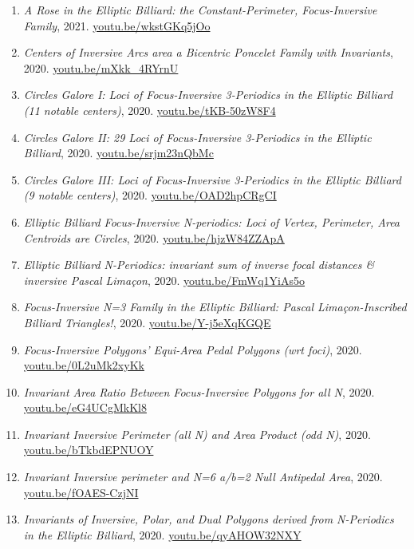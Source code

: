 \documentclass[12pt]{article}
\begin{document}
\begin{enumerate}[resume]
\item \textit{A Rose in the Elliptic Billiard: the Constant-Perimeter, Focus-Inversive Family}, 2021. \href{https://youtu.be/wkstGKq5jOo}{\url{youtu.be/wkstGKq5jOo}}
\item \textit{Centers of Inversive Arcs area a Bicentric Poncelet Family with Invariants}, 2020. \href{https://youtu.be/mXkk_4RYrnU}{\url{youtu.be/mXkk\_4RYrnU}}
\item \textit{Circles Galore I: Loci of Focus-Inversive 3-Periodics in the Elliptic Billiard (11 notable centers)}, 2020. \href{https://youtu.be/tKB-50zW8F4}{\url{youtu.be/tKB-50zW8F4}}
\item \textit{Circles Galore II: 29 Loci of Focus-Inversive 3-Periodics in the Elliptic Billiard}, 2020. \href{https://youtu.be/srjm23nQbMc}{\url{youtu.be/srjm23nQbMc}}
\item \textit{Circles Galore III: Loci of Focus-Inversive 3-Periodics in the Elliptic Billiard (9 notable centers)}, 2020. \href{https://youtu.be/OAD2hpCRgCI}{\url{youtu.be/OAD2hpCRgCI}}
\item \textit{Elliptic Billiard Focus-Inversive N-periodics: Loci of Vertex, Perimeter, Area Centroids are Circles}, 2020. \href{https://youtu.be/hjzW84ZZApA}{\url{youtu.be/hjzW84ZZApA}}
\item \textit{Elliptic Billiard N-Periodics: invariant sum of inverse focal distances \& inversive Pascal Limaçon}, 2020. \href{https://youtu.be/FmWq1YiAs5o}{\url{youtu.be/FmWq1YiAs5o}}
\item \textit{Focus-Inversive N=3 Family in the Elliptic Billiard: Pascal Limaçon-Inscribed Billiard Triangles!}, 2020. \href{https://youtu.be/Y-j5eXqKGQE}{\url{youtu.be/Y-j5eXqKGQE}}
\item \textit{Focus-Inversive Polygons' Equi-Area Pedal Polygons (wrt foci)}, 2020. \href{https://youtu.be/0L2uMk2xyKk}{\url{youtu.be/0L2uMk2xyKk}}
\item \textit{Invariant Area Ratio Between Focus-Inversive Polygons for all N}, 2020. \href{https://youtu.be/eG4UCgMkKl8}{\url{youtu.be/eG4UCgMkKl8}}
\item \textit{Invariant Inversive Perimeter (all N) and Area Product (odd N)}, 2020. \href{https://youtu.be/bTkbdEPNUOY}{\url{youtu.be/bTkbdEPNUOY}}
\item \textit{Invariant Inversive perimeter and N=6 a/b=2 Null Antipedal Area}, 2020. \href{https://youtu.be/fOAES-CzjNI}{\url{youtu.be/fOAES-CzjNI}}
\item \textit{Invariants of Inversive, Polar, and Dual Polygons derived from N-Periodics in the Elliptic Billiard}, 2020. \href{https://youtu.be/qyAHOW32NXY}{\url{youtu.be/qyAHOW32NXY}}

\end{enumerate}
\end{document}
